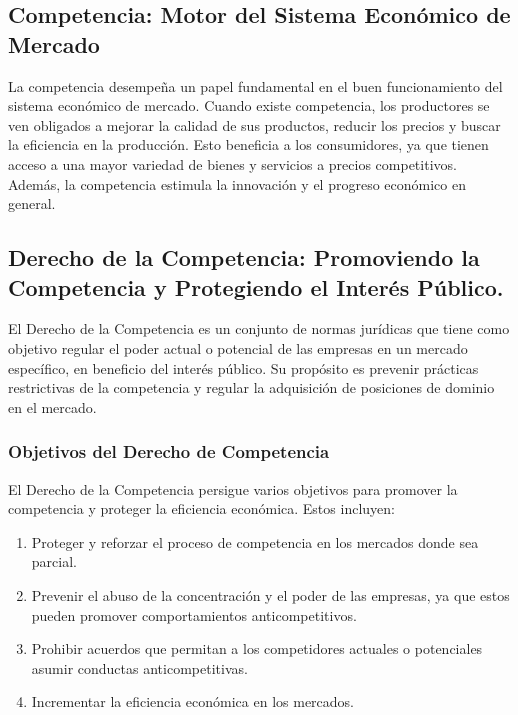 \documentclass[
  letterpaper,
  DIV=11,
  numbers=noendperiod]{scrartcl}
\providecommand{\tightlist}{%
  \setlength{\itemsep}{0pt}\setlength{\parskip}{0pt}}\usepackage{longtable,booktabs,array}
\begin{document}
\hypertarget{competencia-motor-del-sistema-econuxf3mico-de-mercado}{%
\subsection{Competencia: Motor del Sistema Económico de
Mercado}\label{competencia-motor-del-sistema-econuxf3mico-de-mercado}}

La competencia desempeña un papel fundamental en el buen funcionamiento
del sistema económico de mercado. Cuando existe competencia, los
productores se ven obligados a mejorar la calidad de sus productos,
reducir los precios y buscar la eficiencia en la producción. Esto
beneficia a los consumidores, ya que tienen acceso a una mayor variedad
de bienes y servicios a precios competitivos. Además, la competencia
estimula la innovación y el progreso económico en general.

\hypertarget{derecho-de-la-competencia-promoviendo-la-competencia-y-protegiendo-el-interuxe9s-puxfablico.}{%
\subsection{Derecho de la Competencia: Promoviendo la Competencia y
Protegiendo el Interés
Público.}\label{derecho-de-la-competencia-promoviendo-la-competencia-y-protegiendo-el-interuxe9s-puxfablico.}}

El Derecho de la Competencia es un conjunto de normas jurídicas que
tiene como objetivo regular el poder actual o potencial de las empresas
en un mercado específico, en beneficio del interés público. Su propósito
es prevenir prácticas restrictivas de la competencia y regular la
adquisición de posiciones de dominio en el mercado.

\hypertarget{objetivos-del-derecho-de-competencia}{%
\subsubsection{Objetivos del Derecho de
Competencia}\label{objetivos-del-derecho-de-competencia}}

El Derecho de la Competencia persigue varios objetivos para promover la
competencia y proteger la eficiencia económica. Estos incluyen:

\begin{enumerate}
\def\labelenumi{\arabic{enumi}.}
\tightlist
\item
  Proteger y reforzar el proceso de competencia en los mercados donde
  sea parcial.
\item
  Prevenir el abuso de la concentración y el poder de las empresas, ya
  que estos pueden promover comportamientos anticompetitivos.
\item
  Prohibir acuerdos que permitan a los competidores actuales o
  potenciales asumir conductas anticompetitivas.
\item
  Incrementar la eficiencia económica en los mercados.
\end{enumerate}
\end{document}
